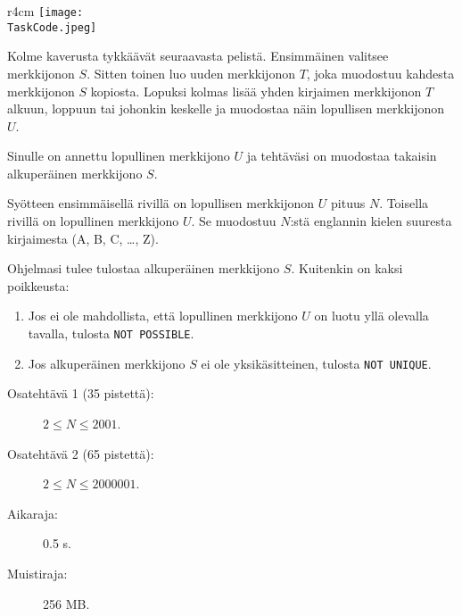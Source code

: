 \documentclass{boi2014-fi}
\renewcommand{\TaskCode}{friends}
\begin{document}
    \begin{wrapfigure}{r}{4cm}
        \vspace{-24pt}
\texttt{[image: \\TaskCode.jpeg]}
\end{wrapfigure}
    Kolme kaverusta tykkäävät seuraavasta pelistä.
    Ensimmäinen valitsee merkkijonon $S$.
    Sitten toinen luo uuden merkkijonon $T$,
    joka muodostuu kahdesta merkkijonon $S$ kopiosta.
    Lopuksi kolmas lisää yhden kirjaimen merkkijonon $T$
    alkuun, loppuun tai johonkin keskelle ja
    muodostaa näin lopullisen merkkijonon $U$.

    \Task
    Sinulle on annettu lopullinen merkkijono $U$ ja tehtäväsi on
    muodostaa takaisin alkuperäinen merkkijono $S$.

    \Input
    Syötteen ensimmäisellä rivillä on lopullisen merkkijonon $U$ pituus $N$.
    Toisella rivillä on lopullinen merkkijono $U$. Se muodostuu $N$:stä
    englannin kielen suuresta kirjaimesta (A, B, C, \ldots{}, Z).

    \Output
    Ohjelmasi tulee tulostaa alkuperäinen merkkijono $S$.
    Kuitenkin on kaksi poikkeusta:
    \begin{enumerate}
        \item Jos ei ole mahdollista, että lopullinen merkkijono $U$ on luotu
        yllä olevalla tavalla, tulosta {\tt NOT POSSIBLE}.
        \item Jos alkuperäinen merkkijono $S$ ei ole yksikäsitteinen,
        tulosta {\tt NOT UNIQUE}.
    \end{enumerate}

    \Examples


    \Scoring

    \begin{description}
        \item[Osatehtävä 1 (35 pistettä):] $2 \le N \le 2001$.
        \item[Osatehtävä 2 (65 pistettä):] $2 \le N \le 2000001$.
    \end{description}

    \Constraints

    \begin{description}
        \item[Aikaraja:] 0.5 s.
        \item[Muistiraja:] 256 MB.
    \end{description}
\end{document}
